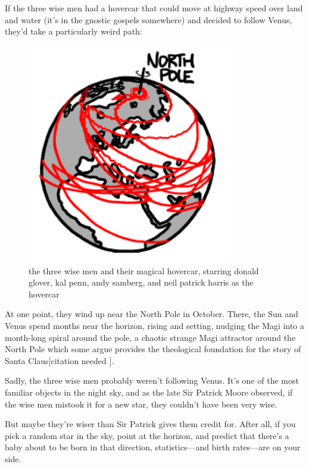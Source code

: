 {If the three wise men had a hovercar that could move at highway speed over land and water (it’s in the gnostic gospels somewhere) and decided to follow Venus, they’d take a particularly weird path:}

\begin{figure}[!htbp]
\centering
\includegraphics[scale=0.5, max width=0.8\textwidth]{imgs/a/25/magi_venus_car.png}
\caption{the three wise men and their magical hovercar, starring donald glover, kal penn, andy samberg, and neil patrick harris as the hovercar}
\end{figure}

{At one point, they wind up near the North Pole in October. There, the Sun and Venus spend months near the horizon, rising and setting, nudging the Magi into a month-long spiral around the pole, a chaotic strange Magi attractor around the North Pole which some argue provides the theological foundation for the story of Santa Claus[{citation needed} ].}

{Sadly, the three wise men probably weren’t following Venus. It’s one of the most familiar objects in the night sky, and as the late Sir Patrick Moore observed, if the wise men mistook it for a new star, they couldn’t have been very wise.}

{But maybe they’re wiser than Sir Patrick gives them credit for. After all, if you pick a random star in the sky, point at the horizon, and predict that there’s a baby about to be born in that direction, statistics—and birth rates—are on your side.}

